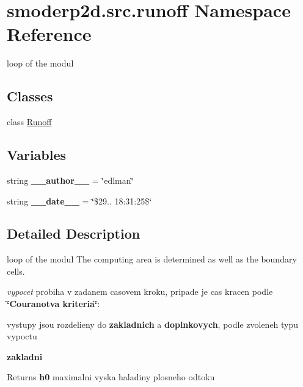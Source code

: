 \hypertarget{namespacesmoderp2d_1_1src_1_1runoff}{\section{smoderp2d.\-src.\-runoff Namespace Reference}
\label{namespacesmoderp2d_1_1src_1_1runoff}
}


loop of the modul  


\subsection*{Classes}
\begin{DoxyCompactItemize}
\item 
class \hyperlink{classsmoderp2d_1_1src_1_1runoff_1_1Runoff}{Runoff}
\end{DoxyCompactItemize}
\subsection*{Variables}
\begin{DoxyCompactItemize}
\item 
\hypertarget{namespacesmoderp2d_1_1src_1_1runoff_a82ea7ee00bf9c766aa1e366a184b4a57}{string {\bfseries \-\_\-\-\_\-author\-\_\-\-\_\-} = \char`\"{}edlman\char`\"{}}\label{namespacesmoderp2d_1_1src_1_1runoff_a82ea7ee00bf9c766aa1e366a184b4a57}

\item 
\hypertarget{namespacesmoderp2d_1_1src_1_1runoff_ad0163d8013d0f0f3cd12f9fcda57854d}{string {\bfseries \-\_\-\-\_\-date\-\_\-\-\_\-} = \char`\"{}\$29.. 18\-:31\-:25\$\char`\"{}}\label{namespacesmoderp2d_1_1src_1_1runoff_ad0163d8013d0f0f3cd12f9fcda57854d}

\end{DoxyCompactItemize}


\subsection{Detailed Description}
loop of the modul The computing area is determined as well as the boundary cells.

{\itshape vypocet} probiha v zadanem casovem kroku, pripade je cas kracen podle {\bfseries \char`\"{}\-Couranotva kriteria\char`\"{}}\-:
\begin{DoxyItemize}
\item vystupy jsou rozdelieny do {\bfseries zakladnich} a {\bfseries doplnkovych}, podle zvoleneh typu vypoctu
\item {\bfseries zakladni} 
\begin{DoxyItemize}
\item \begin{DoxyReturn}{Returns}
{\bfseries h0} maximalni vyska haladiny plosneho odtoku 
\end{DoxyReturn}

\end{DoxyItemize}
\end{DoxyItemize}